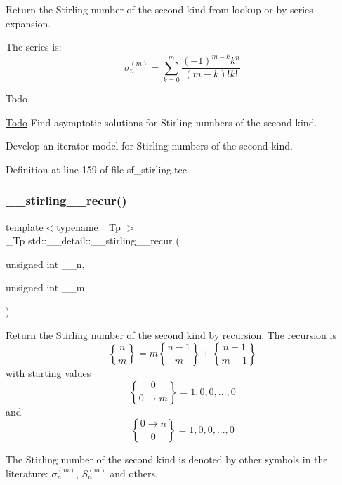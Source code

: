 Return the Stirling number of the second kind from lookup or by series expansion.

The series is\+: \[ \sigma_n^{(m)} = \sum_{k=0}^{m}\frac{(-1)^{m-k}k^n}{(m-k)!k!} \]

\begin{DoxyRefDesc}{Todo}
\item[\hyperlink{todo__todo000015}{Todo}]Find asymptotic solutions for Stirling numbers of the second kind. 

Develop an iterator model for Stirling numbers of the second kind. \end{DoxyRefDesc}


Definition at line 159 of file sf\+\_\+stirling.\+tcc.

\mbox{\label{namespacestd_1_1____detail_a23c6eb236cd8ddcfbe43e66ac23324db}} 
\subsubsection{\texorpdfstring{\+\_\+\+\_\+stirling\+\_\+\_\+recur()}{\_\_stirling\_2\_recur()}}
{\footnotesize\ttfamily template$<$typename \+\_\+\+Tp $>$ \\
\+\_\+\+Tp std\+::\+\_\+\+\_\+detail\+::\+\_\+\+\_\+stirling\+\_\+\_\+recur (\begin{DoxyParamCaption}\item[{unsigned int}]{\+\_\+\+\_\+n,  }\item[{unsigned int}]{\+\_\+\+\_\+m }\end{DoxyParamCaption})}

Return the Stirling number of the second kind by recursion. The recursion is \[ \newcommand{\stirling}[2]{\genfrac{\{}{\}}{0pt}{0}{#1}{#2}} \stirling{n}{m} = m \stirling{n-1}{m} + \stirling{n-1}{m-1} \] with starting values \[ \newcommand{\stirling}[2]{\genfrac{\{}{\}}{0pt}{0}{#1}{#2}} \stirling{0}{0\rightarrow m} = {1, 0, 0, ..., 0} \] and \[ \newcommand{\stirling}[2]{\genfrac{\{}{\}}{0pt}{0}{#1}{#2}} \stirling{0\rightarrow n}{0} = {1, 0, 0, ..., 0} \]

The Stirling number of the second kind is denoted by other symbols in the literature\+: $ \sigma_n^{(m)} $, $ \textit{S}_n^{(m)} $ and others. 

